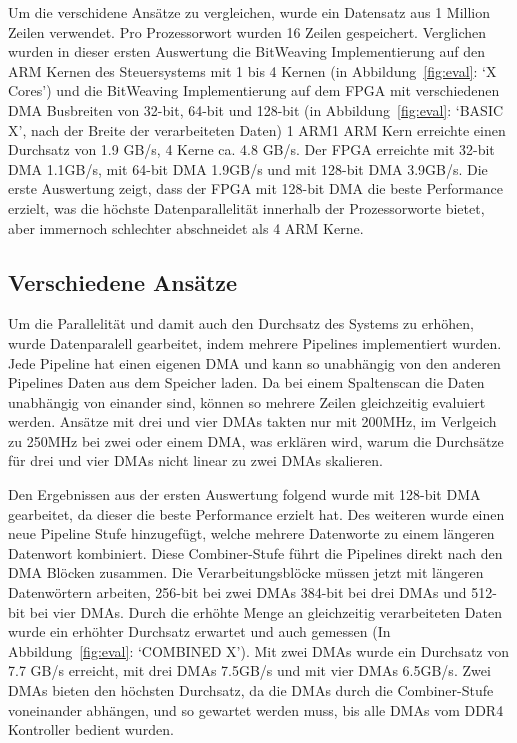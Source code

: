 \documentclass[conference]{IEEEtran}
\begin{document}
Um die verschidene Ansätze zu vergleichen, wurde ein Datensatz aus 1 Million Zeilen verwendet. Pro Prozessorwort wurden 16 Zeilen gespeichert. Verglichen wurden in dieser ersten Auswertung
die BitWeaving Implementierung auf den ARM Kernen des Steuersystems mit 1 bis 4 Kernen (in Abbildung~\ref{fig:eval}: `X Cores') und die BitWeaving Implementierung auf dem FPGA mit verschiedenen DMA Busbreiten
von 32-bit, 64-bit und 128-bit (in Abbildung~\ref{fig:eval}: `BASIC X', nach der Breite der verarbeiteten Daten) 1 ARM1 ARM Kern erreichte einen Durchsatz von 1.9 GB/s, 4 Kerne ca. 4.8 GB/s. Der FPGA erreichte mit 32-bit DMA 1.1GB/s,
mit 64-bit DMA 1.9GB/s und mit 128-bit DMA 3.9GB/s. Die erste Auswertung zeigt, dass der FPGA mit 128-bit DMA die beste Performance erzielt, was die höchste Datenparallelität innerhalb der
Prozessorworte bietet, aber immernoch schlechter abschneidet als 4 ARM Kerne.



\subsection{Verschiedene Ansätze}

Um die Parallelität und damit auch den Durchsatz des Systems zu erhöhen, wurde Datenparalell gearbeitet, indem mehrere Pipelines implementiert wurden. Jede Pipeline
hat einen eigenen DMA und kann so unabhängig von den anderen Pipelines Daten aus dem Speicher laden. Da bei einem Spaltenscan die Daten unabhängig von einander sind,
können so mehrere Zeilen gleichzeitig evaluiert werden. Ansätze mit drei und vier DMAs takten nur mit 200MHz, im Verlgeich zu 250MHz bei zwei oder einem DMA, was erklären wird,
warum die Durchsätze für drei und vier DMAs nicht linear zu zwei DMAs skalieren.

Den Ergebnissen aus der ersten Auswertung folgend wurde mit 128-bit DMA gearbeitet, da dieser die beste Performance erzielt hat. Des weiteren wurde einen neue Pipeline Stufe
hinzugefügt, welche mehrere Datenworte zu einem längeren Datenwort kombiniert. Diese Combiner-Stufe führt die Pipelines direkt nach den DMA Blöcken zusammen. Die Verarbeitungsblöcke
müssen jetzt mit längeren Datenwörtern arbeiten, 256-bit bei zwei DMAs 384-bit bei drei DMAs und 512-bit bei vier DMAs. Durch die erhöhte Menge an gleichzeitig verarbeiteten Daten
wurde ein erhöhter Durchsatz erwartet und auch gemessen (In Abbildung~\ref{fig:eval}: `COMBINED X'). Mit zwei DMAs wurde ein Durchsatz von 7.7 GB/s erreicht, mit drei DMAs 7.5GB/s und mit vier DMAs 6.5GB/s.
Zwei DMAs bieten den höchsten Durchsatz, da die DMAs durch die Combiner-Stufe voneinander abhängen, und so gewartet werden muss, bis alle DMAs vom DDR4 Kontroller bedient wurden.
\end{document}
